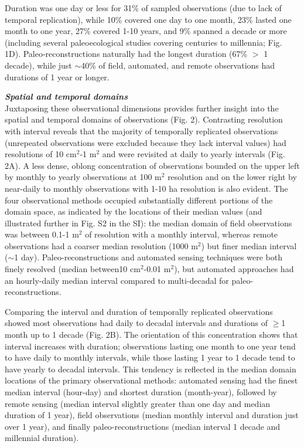 \documentclass[12pt]{article}
\begin{document}
Duration was one day or less for 31\% of sampled observations (due to lack of temporal replication), while 10\% covered one day to one month, 23\% lasted one month to one year, 27\% covered 1-10 years, and 9\% spanned a decade or more (including several paleoecological studies covering centuries to millennia; Fig. 1D). Paleo-reconstructions naturally had the longest duration (67\% $>$ 1 decade), while just $\sim$40\% of field, automated, and remote observations had durations of 1 year or longer.

\noindent \textbf{\emph{Spatial and temporal domains}}\\
Juxtaposing these observational dimensions provides further insight into the spatial and temporal domains of observations (Fig. 2). Contrasting resolution with interval reveals that the majority of temporally replicated observations (unrepeated observations were excluded because they lack interval values) had resolutions of 10 cm$^2$-1 m$^2$ and were revisited at daily to yearly intervals (Fig. 2A). A less dense, oblong concentration of observations bounded on the upper left by monthly to yearly observations at 100 m$^2$ resolution and on the lower right by near-daily to monthly observations with 1-10 ha resolution is also evident. The four observational methods occupied substantially different portions of the domain space, as indicated by the locations of their median values (and illustrated further in Fig. S2 in the SI): the median domain of field observations was between 0.1-1 m$^2$ of resolution with a monthly interval, whereas remote observations had a coarser median resolution (1000 m$^2$) but finer median interval ($\sim$1 day). Paleo-reconstructions and automated sensing techniques were both finely resolved (median between10 cm$^2$-0.01 m$^2$), but automated approaches had an hourly-daily median interval compared to multi-decadal for paleo-reconstructions. 

Comparing the interval and duration of temporally replicated observations showed most observations had daily to decadal intervals and durations of $\geq$1 month up to 1 decade (Fig. 2B). The orientation of this concentration shows that interval increases with duration; observations lasting one month to one year tend to have daily to monthly intervals, while those lasting 1 year to 1 decade tend to have yearly to decadal intervals. This tendency is reflected in the median domain locations of the primary observational methods: automated sensing had the finest median interval (hour-day) and shortest duration (month-year), followed by remote sensing (median interval slightly greater than one day and median duration of 1 year), field observations (median monthly interval and duration just over 1 year), and finally paleo-reconstructions (median interval 1 decade and millennial duration). 
\end{document}
